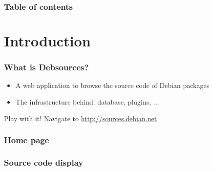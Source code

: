 \documentclass{beamer}
\begin{document}
\begin{frame}
  \frametitle{Table of contents}
  \tableofcontents
\end{frame}

\section{Introduction}

\begin{frame}
  \frametitle{What is Debsources?}
  \begin{itemize}
    \item A web application to browse \alert{the source code} of
      Debian packages
    \item The infrastructure behind: \alert{database},
      \alert{plugins}, ...
  \end{itemize}
  \vspace{1cm}
  \pause
  \begin{block}{Play with it!}
    Navigate to \url{http://sources.debian.net}
  \end{block}
\end{frame}

\begin{frame}
  \frametitle{Home page}
\end{frame}

\begin{frame}
  \frametitle{Source code display}
\end{frame}
\end{document}
